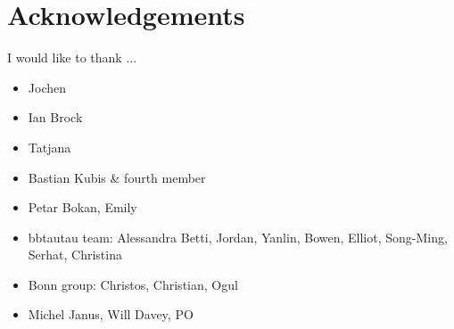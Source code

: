 \chapter*{Acknowledgements}
\label{sec:ack}

I would like to thank ...

\begin{itemize}
\item Jochen
\item Ian Brock
\item Tatjana
\item Bastian Kubis \& fourth member
\item Petar Bokan, Emily
\item bbtautau team: Alessandra Betti, Jordan, Yanlin, Bowen, Elliot, Song-Ming, Serhat, Christina
\item Bonn group: Christos, Christian, Ogul
\item Michel Janus, Will Davey, PO
\end{itemize}

